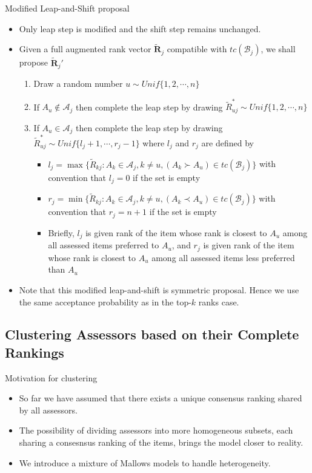 \documentclass[11pt]{beamer}
\begin{document}
\begin{frame}{Modified Leap-and-Shift proposal}
\begin{itemize}
    \item Only leap step is modified and the shift step remains unchanged.
    \item Given a full augmented rank vector $\tilde{\mathbf{R}}_j$ compatible with $tc(\mathcal{B}_j)$, we shall propose $\tilde{\mathbf{R}}_j'$
    \begin{enumerate}
        \item Draw a random number $u\sim Unif\{1,2,\cdots, n\}$
        \item If $A_u \notin \mathcal{A}_j$ then complete the leap step by drawing $\tilde{R}_{uj}^*\sim Unif\{1,2,\cdots, n\}$
        \item If $A_u \in \mathcal{A}_j$ then complete the leap step by drawing $\tilde{R}_{uj}^*\sim Unif\{l_j+1, \cdots, r_j-1\}$ where $l_j$ and $r_j$ are defined by
        \begin{itemize}
            \item $l_j=\max\{\tilde{R}_{kj} : A_k\in \mathcal{A}_j, k\neq u, (A_k\succ A_u)\in tc(\mathcal{B}_j) \}$ with convention that $l_j=0$ if the set is empty
            \item $r_j=\min\{\tilde{R}_{kj} : A_k\in \mathcal{A}_j, k\neq u, (A_k\prec A_u)\in tc(\mathcal{B}_j) \}$ with convention that $r_j=n+1$ if the set is empty
            \item Briefly, $l_j$ is given rank of the item whose rank is closest to $A_u$ among all assessed items preferred to $A_u$, and $r_j$ is given rank of the item whose rank is closest to $A_u$ among all assessed items less preferred than $A_u$
        \end{itemize} 
    \end{enumerate}
    \item Note that this modified leap-and-shift is symmetric proposal. Hence we use the same acceptance probability as in the top-$k$ ranks case.
\end{itemize}
\end{frame}

\subsection{Clustering Assessors based on their Complete Rankings}
\begin{frame}{Motivation for clustering}
\begin{itemize}
    \item So far we have assumed that there exists a unique consensus ranking shared by all assessors. 
    \item The possibility of dividing assessors into more homogeneous subsets, each sharing a consesnsus ranking of the items, brings the model closer to reality. 
    \item We introduce a mixture of Mallows models to handle heterogeneity.
\end{itemize}
\end{frame}
\end{document}
